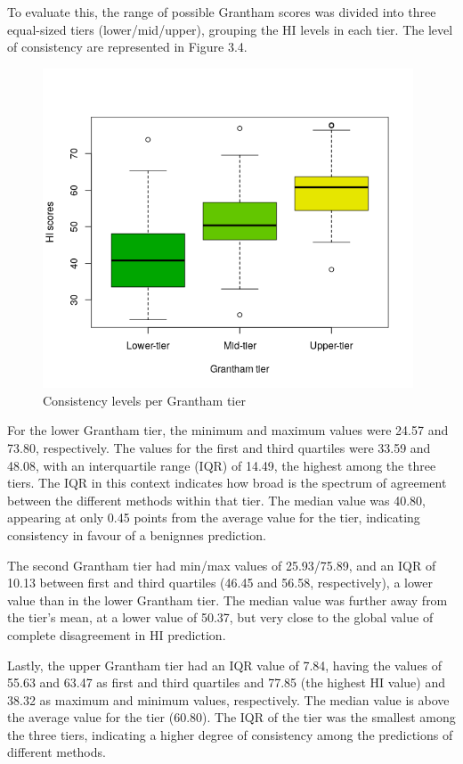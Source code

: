 \documentclass[12pt,MSc,wordcount,anon]{muthesis}
\begin{document}
\begin{flushleft}
To evaluate this, the range of possible Grantham scores was divided into three equal-sized tiers (lower/mid/upper), grouping the HI levels in each tier. The level of consistency are represented in Figure 3.4.

\begin{figure}
\begin{center}
\includegraphics[width=11cm]{img/boxplot}
\end{center}
\caption{Consistency levels per Grantham tier}
\label{fig:fig-eg}  
\end{figure}

For the lower Grantham tier, the minimum and maximum values were 24.57 and 73.80, respectively. The values for the first and third quartiles were 33.59 and 48.08, with an interquartile range (IQR) of 14.49, the highest among the three tiers. The IQR in this context indicates how broad is the spectrum of agreement between the different methods within that tier. The median value was 40.80, appearing at only 0.45 points from the average value for the tier, indicating consistency in favour of a benignnes prediction.

The second Grantham tier had min/max values of 25.93/75.89, and an IQR of 10.13 between first and third quartiles (46.45 and 56.58, respectively), a lower value than in the lower Grantham tier. The median value was further away from the tier's mean, at a lower value of 50.37, but very close to the global value of complete disagreement in HI prediction.

Lastly, the upper Grantham tier had an IQR value of 7.84, having the values of 55.63 and 63.47 as first and third quartiles and 77.85 (the highest HI value) and 38.32 as maximum and minimum values, respectively. The median value is above the average value for the tier (60.80). The IQR of the tier was the smallest among the three tiers, indicating a higher degree of consistency among the predictions of different methods.


\end{flushleft}
\end{document}
